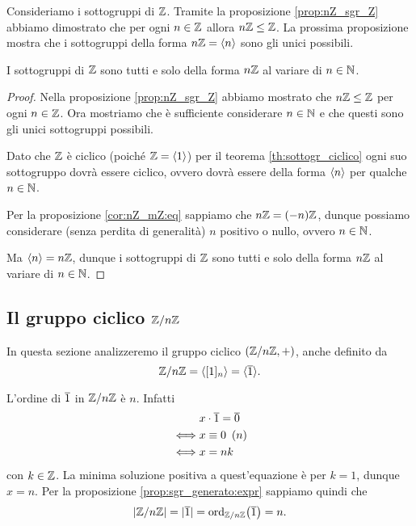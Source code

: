 Consideriamo i sottogruppi di $\mathbb{Z}$. Tramite la proposizione \ref{prop:nZ_sgr_Z} abbiamo dimostrato che per ogni $n \in \mathbb{Z}$ allora $n\mathbb{Z} \leq \mathbb{Z}$. La prossima proposizione mostra che i sottogruppi della forma $n\mathbb{Z} = \langle n\rangle$ sono gli unici possibili.

\begin{proposition}
    \label{prop:sgr_Z}
    I sottogruppi di $\mathbb{Z}$ sono tutti e solo della forma $n\mathbb{Z}$ al variare di $n \in \mathbb{N}$.
\end{proposition}
\begin{proof}
    Nella proposizione \ref{prop:nZ_sgr_Z} abbiamo mostrato che $n\mathbb{Z} \leq \mathbb{Z}$ per ogni $n \in \mathbb{Z}$. Ora mostriamo che è sufficiente considerare $n \in \mathbb{N}$ e che questi sono gli unici sottogruppi possibili.

    Dato che $\mathbb{Z}$ è ciclico (poiché $\mathbb{Z} = \langle1\rangle$) per il teorema \ref{th:sottogr_ciclico} ogni suo sottogruppo dovrà essere ciclico, ovvero dovrà essere della forma $\langle n\rangle$ per qualche $n \in \mathbb{N}$.

    Per la proposizione \ref{cor:nZ_mZ:eq} sappiamo che $n\mathbb{Z} = (-n)\mathbb{Z}$, dunque possiamo considerare (senza perdita di generalità) $n$ positivo o nullo, ovvero $n \in \mathbb{N}$.

    Ma $\langle n\rangle = n\mathbb{Z}$, dunque i sottogruppi di $\mathbb{Z}$ sono tutti e solo della forma $n\mathbb{Z}$ al variare di $n \in \mathbb{N}$.
\end{proof}


\subsection{Il gruppo ciclico $\mathbb{Z}/n\mathbb{Z}$}

In questa sezione analizzeremo il gruppo ciclico $(\mathbb{Z}/n\mathbb{Z}, +)$, anche definito da \[
    \Zmod{n} = \cycl{[1]_n} = \cycl{\eqclass 1}.
\]

L'ordine di $\eqclass 1$ in $\mathbb{Z}/n\mathbb{Z}$ è $n$. Infatti \begin{align*}
    &x\cdot \eqclass 1 = \eqclass 0\\
    \iff &x \congr 0 \Mod n \\
    \iff &x = nk
\end{align*}
con $k \in \mathbb{Z}$. 
La minima soluzione positiva a quest'equazione è per $k = 1$, dunque $x = n$. 
Per la proposizione \ref{prop:sgr_generato:expr} sappiamo quindi che \begin{equation} \label{eq:card_Z/nZ}
    \abs{\Zmod{n}} = \abs{\eqclass 1} = \ord[\Zmod{n}]{\eqclass 1} = n.
\end{equation}

